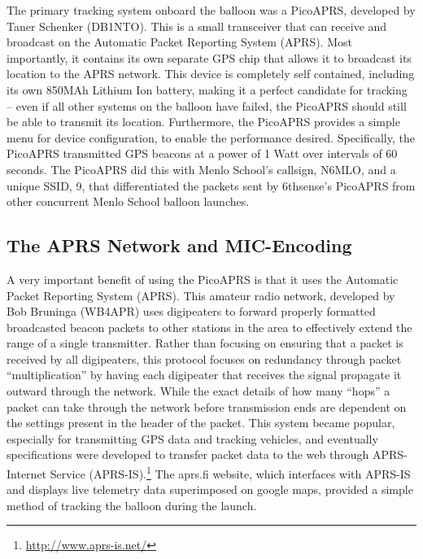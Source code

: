 \documentclass[12pt,]{article}
\let\rmarkdownfootnote\footnote%
\def\footnote{\protect\rmarkdownfootnote}
\begin{document}
The primary tracking system onboard the balloon was a PicoAPRS,
developed by Taner Schenker (DB1NTO). This is a small transceiver that
can receive and broadcast on the Automatic Packet Reporting System
(APRS). Most importantly, it contains its own separate GPS chip that
allows it to broadcast its location to the APRS network. This device is
completely self contained, including its own 850MAh Lithium Ion battery,
making it a perfect candidate for tracking -- even if all other systems
on the balloon have failed, the PicoAPRS should still be able to
transmit its location. Furthermore, the PicoAPRS provides a simple menu
for device configuration, to enable the performance desired.
Specifically, the PicoAPRS transmitted GPS beacons at a power of 1 Watt
over intervals of 60 seconds. The PicoAPRS did this with Menlo School's
callsign, N6MLO, and a unique SSID, 9, that differentiated the packets
sent by 6thsense's PicoAPRS from other concurrent Menlo School balloon
launches.

\subsection{The APRS Network and
MIC-Encoding}\label{the-aprs-network-and-mic-encoding}

A very important benefit of using the PicoAPRS is that it uses the
Automatic Packet Reporting System (APRS). This amateur radio network,
developed by Bob Bruninga (WB4APR) uses digipeaters to forward properly
formatted broadcasted beacon packets to other stations in the area to
effectively extend the range of a single transmitter. Rather than
focusing on ensuring that a packet is received by all digipeaters, this
protocol focuses on redundancy through packet ``multiplication'' by
having each digipeater that receives the signal propagate it outward
through the network. While the exact details of how many ``hops'' a
packet can take through the network before transmission ends are
dependent on the settings present in the header of the packet. This
system became popular, especially for transmitting GPS data and tracking
vehicles, and eventually specifications were developed to transfer
packet data to the web through APRS-Internet Service
(APRS-IS).\footnote{\url{http://www.aprs-is.net/}} The aprs.fi website,
which interfaces with APRS-IS and displays live telemetry data
superimposed on google maps, provided a simple method of tracking the
balloon during the launch.
\end{document}
